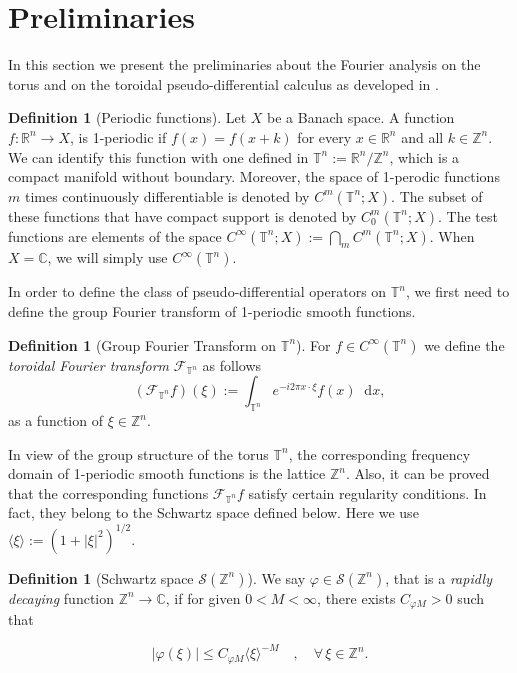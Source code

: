 \documentclass[12pt, reqno]{amsart}
\theoremstyle{definition}
\newtheorem{definition}[theorem]{Definition}
\theoremstyle{remark}
\numberwithin{equation}{section}
\newcommand*\diff{\mathop{}\!\mathrm{d}}
\begin{document}
\section{Preliminaries}
\label{section:prelims}
In this section we present the preliminaries about the Fourier analysis on the torus and on the toroidal pseudo-differential calculus as developed in \cite{ruzhansky-turunen}.

\begin{definition}[Periodic functions] 
    Let $X$ be a Banach space. A function $f: \mathbb{R}^n \rightarrow X$, is 1-periodic if $f(x) = f(x + k)$ for every $ x \in \mathbb{R}^n $ and all $ k \in \mathbb{Z}^n $. We can identify this function with one defined in $\mathbb{T}^n := \mathbb{R}^n / \mathbb{Z}^n $, which is a compact manifold without boundary. Moreover, the space of 1-perodic functions $m$ times continuously differentiable is denoted by $C^m(\mathbb{T}^n;X)$. The subset of these functions that have compact support is denoted by $C^m_0(\mathbb{T}^n;X)$.  The test functions are elements of the space $C^\infty(\mathbb{T}^n;X) := \bigcap_m C^m(\mathbb{T}^n;X)$. When $X=\mathbb{C}$, we will simply use $C^\infty(\mathbb{T}^n)$.
\end{definition}
In order to define the class of pseudo-differential operators on $\mathbb{T}^n$, we first need to define the group Fourier transform of 1-periodic smooth functions.
\begin{definition}[Group Fourier Transform on $\mathbb{T}^n$]
    For $f \in C^\infty(\mathbb{T}^n)$ we define the  \textit{toroidal Fourier transform} $\mathcal{F}_{\mathbb{T}^n}$ as follows
    \begin{equation*}
        (\mathcal{F}_{\mathbb{T}^n}f)(\xi) := \int_{\mathbb{T}^n} e^{-i2\pi x \cdot \xi}f(x)\diff x, 
    \end{equation*}
    as a function of $\xi \in \mathbb{Z}^n$.
\end{definition}
In view of the group structure of the torus $\mathbb{T}^n$, the corresponding frequency domain of 1-periodic smooth functions is the lattice $\mathbb{Z}^n$. Also, it can be proved that the corresponding functions $\mathcal{F}_{\mathbb{T}^n}f$ satisfy certain regularity conditions. In fact, they belong to the Schwartz space defined below.
Here we use $\langle\xi\rangle:= (1+|\xi|^2)^{1/2}$.
\begin{definition}[Schwartz space $\mathcal{S}(\mathbb{Z}^n) $]
    We say $\varphi \in \mathcal{S}(\mathbb{Z}^n)$, that is a \textit{rapidly decaying} function $\mathbb{Z}^n \rightarrow \mathbb{C}$, if for given $0<M<\infty$, there exists $C_{\varphi M} > 0$ such that 

    \begin{equation*}
        |\varphi(\xi)| \leq C_{\varphi M} \langle\xi\rangle^{-M} \quad , \quad \forall\, \xi \in \mathbb{Z}^n.
    \end{equation*}
\end{definition}
\end{document}

